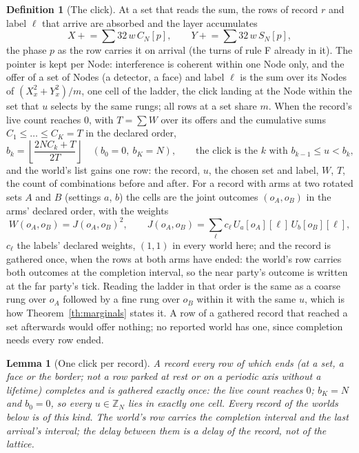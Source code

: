 \documentclass[11pt]{article}
\newtheorem{lemma}{Lemma}
\theoremstyle{definition}
\newtheorem{definition}{Definition}
\newcommand{\Z}{\mathbb{Z}}
\newcommand{\rung}{b}
\begin{document}
\begin{definition}[The click]\label{def:click}
At a set that reads the sum, the rows of record $r$ and label $\ell$ that
arrive are absorbed and the layer accumulates
\begin{equation}
X \mathrel{+}= \sum 32\,w\,C_N[p],\qquad Y \mathrel{+}= \sum 32\,w\,S_N[p],
\end{equation}
the phase $p$ as the row carries it on arrival (the turns of rule F
already in it). The pointer is kept per Node:
interference is coherent within one Node only, and the offer of a set of
Nodes (a detector, a face) and label $\ell$ is the sum over its Nodes of
$(X_x^2 + Y_x^2)/m$, one cell of the ladder, the click landing at the Node
within the set that $u$ selects by the same rungs; all rows at a set share
$m$. When the record's live count reaches $0$, with $T = \sum W$ over its
offers and the cumulative sums $C_1 \le \dots \le C_K = T$ in the declared
order,
\begin{equation}
\rung_k = \left\lfloor \frac{2N C_k + T}{2T} \right\rfloor \quad (\rung_0 = 0,\ \rung_K = N),
\qquad \text{the click is the } k \text{ with } \rung_{k-1} \le u < \rung_k,
\label{eq:rung}
\end{equation}
and the world's list gains one row: the record, $u$, the chosen set and
label, $W$, $T$, the count of combinations before and after. For a record
with arms at two rotated sets $A$ and $B$ (settings $a$, $b$) the cells
are the joint outcomes $(o_A, o_B)$ in the arms' declared order, with
the weights
\begin{equation}
W(o_A, o_B) = J(o_A, o_B)^2,\qquad J(o_A, o_B) = \sum_\ell c_\ell\,U_a[o_A][\ell]\,U_b[o_B][\ell],
\label{eq:joint}
\end{equation}
$c_\ell$ the labels' declared weights, $(1, 1)$ in every world here; and
the record is gathered once, when the rows at both arms have ended:
the world's row carries both outcomes at the completion interval, so the
near party's outcome is written at the far party's tick. Reading the
ladder in that order is the same as a coarse rung over $o_A$ followed by
a fine rung over $o_B$ within it with the same $u$, which is how
Theorem~\ref{th:marginals} states it. A row of a gathered record that
reached a set afterwards would offer nothing; no reported world has one,
since completion needs every row ended.
\end{definition}

\begin{lemma}[One click per record]\label{lem:one}
A record every row of which ends (at a set, a face or the border; not a
row parked at rest or on a periodic axis without a lifetime) completes
and is gathered exactly once: the live count reaches $0$; $\rung_K = N$
and $\rung_0 = 0$, so every $u \in \Z_N$ lies in exactly one cell. Every
record of the worlds below is of this kind. The world's row carries the
completion interval and the last arrival's interval; the delay between
them is a delay of the record, not of the lattice.
\end{lemma}
\end{document}
